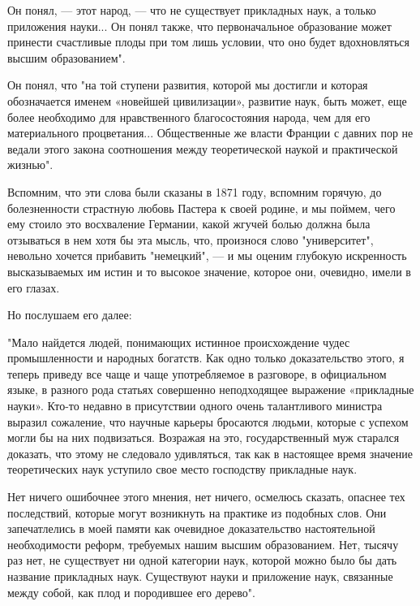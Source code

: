 Он понял, --- этот народ, --- что не существует прикладных наук, а только
приложения науки... Он понял также, что первоначальное образование
может принести счастливые плоды при том лишь условии, что оно будет
вдохновляться высшим образованием".

Он понял, что "на той ступени развития, которой мы достигли и которая
обозначается именем «новейшей цивилизации», развитие наук, быть может,
еще более необходимо для нравственного благосостояния народа, чем для
его материального процветания... Общественные же власти Франции с
давних пор не ведали этого закона соотношения между теоретической
наукой и практической жизнью".

Вспомним, что эти слова были сказаны  в 1871 году, вспомним горячую,  до
болезненности страстную любовь Пастера к своей родине, и мы поймем, чего
ему стоило  это восхваление  Германии, какой  жгучей болью  должна  была
отзываться в нем хотя бы эта мысль, что, произнося слово  "университет",
невольно  хочется  прибавить   "немецкий",  ---  и   мы  оценим   глубокую
искренность высказываемых им истин и  то высокое значение, которое  они,
очевидно, имели в его глазах.

Но послушаем его далее:

"Мало найдется людей, понимающих истинное происхождение чудес
промышленности и народных богатств. Как одно только доказательство
этого, я теперь приведу все чаще и чаще употребляемое в разговоре, в
официальном языке, в разного рода статьях совершенно неподходящее
выражение «прикладные науки». Кто-то недавно в присутствии одного
очень талантливого министра выразил сожаление, что научные карьеры
бросаются людьми, которые с успехом могли бы на них подвизаться.
Возражая на это, государственный муж старался доказать, что этому не
следовало удивляться, так как в настоящее время значение теоретических
наук уступило свое место господству прикладные наук.

Нет ничего ошибочнее этого мнения, нет ничего, осмелюсь сказать,
опаснее тех последствий, которые могут возникнуть на практике из
подобных слов. Они запечатлелись в моей памяти как очевидное
доказательство настоятельной необходимости реформ, требуемых нашим
высшим образованием. Нет, тысячу раз нет, не существует ни одной
категории наук, которой можно было бы дать название прикладных наук.
Существуют науки и приложение наук, связанные между собой, как плод и
породившее его дерево".

